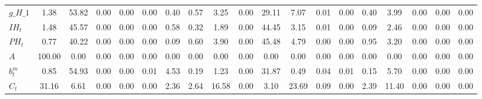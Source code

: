 \begin{center}
\begin{longtable}{lcccccccccccccccccc}
$g\_H\_1            $	 & 	             1.38	 & 	            53.82	 & 	             0.00	 & 	             0.00	 & 	             0.00	 & 	             0.40	 & 	             0.57	 & 	             3.25	 & 	             0.00	 & 	            29.11	 & 	             7.07	 & 	             0.01	 & 	             0.00	 & 	             0.40	 & 	             3.99	 & 	             0.00	 & 	             0.00	 & 	             0.00 \\ 
$IH_t               $	 & 	             1.48	 & 	            45.57	 & 	             0.00	 & 	             0.00	 & 	             0.00	 & 	             0.58	 & 	             0.32	 & 	             1.89	 & 	             0.00	 & 	            44.45	 & 	             3.15	 & 	             0.01	 & 	             0.00	 & 	             0.09	 & 	             2.46	 & 	             0.00	 & 	             0.00	 & 	             0.00 \\ 
$PH_t               $	 & 	             0.77	 & 	            40.22	 & 	             0.00	 & 	             0.00	 & 	             0.00	 & 	             0.09	 & 	             0.60	 & 	             3.90	 & 	             0.00	 & 	            45.48	 & 	             4.79	 & 	             0.00	 & 	             0.00	 & 	             0.95	 & 	             3.20	 & 	             0.00	 & 	             0.00	 & 	             0.00 \\ 
$ A                 $	 & 	           100.00	 & 	             0.00	 & 	             0.00	 & 	             0.00	 & 	             0.00	 & 	             0.00	 & 	             0.00	 & 	             0.00	 & 	             0.00	 & 	             0.00	 & 	             0.00	 & 	             0.00	 & 	             0.00	 & 	             0.00	 & 	             0.00	 & 	             0.00	 & 	             0.00	 & 	             0.00 \\ 
$ b^m_t             $	 & 	             0.85	 & 	            54.93	 & 	             0.00	 & 	             0.00	 & 	             0.01	 & 	             4.53	 & 	             0.19	 & 	             1.23	 & 	             0.00	 & 	            31.87	 & 	             0.49	 & 	             0.04	 & 	             0.01	 & 	             0.15	 & 	             5.70	 & 	             0.00	 & 	             0.00	 & 	             0.00 \\ 
$ C_t               $	 & 	            31.16	 & 	             6.61	 & 	             0.00	 & 	             0.00	 & 	             0.00	 & 	             2.36	 & 	             2.64	 & 	            16.58	 & 	             0.00	 & 	             3.10	 & 	            23.69	 & 	             0.09	 & 	             0.00	 & 	             2.39	 & 	            11.40	 & 	             0.00	 & 	             0.00	 & 	             0.00 \\ 

\end{longtable}
\end{center}
